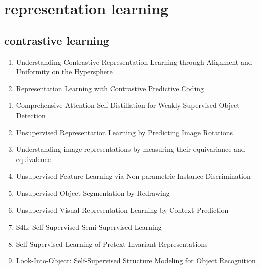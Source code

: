 \documentclass[acmlarge]{acmart}
\begin{document}
\section{representation learning}
	\subsection{contrastive learning}
	\begin{enumerate}
		\item Understanding Contrastive Representation Learning through Alignment and Uniformity on the Hypersphere \cite{Wang2020UnderstandingCR} 

		\item Representation Learning with Contrastive Predictive Coding \cite{Oord2018RepresentationLW} 

	\end{enumerate}
\begin{enumerate}
	\item Comprehensive Attention Self-Distillation for Weakly-Supervised Object Detection \cite{Huang2020ComprehensiveAS} 

	\item Unsupervised Representation Learning by Predicting Image Rotations \cite{Gidaris2018UnsupervisedRL} 

	\item Understanding image representations by measuring their equivariance and equivalence \cite{Lenc2015UnderstandingIR} 

	\item Unsupervised Feature Learning via Non-parametric Instance Discrimination \cite{Wu2018UnsupervisedFL} 

	\item Unsupervised Object Segmentation by Redrawing \cite{Chen2019UnsupervisedOS} 

	\item Unsupervised Visual Representation Learning by Context Prediction \cite{Doersch2015UnsupervisedVR} 

	\item S4L: Self-Supervised Semi-Supervised Learning \cite{Zhai2019S4LSS} 

	\item Self-Supervised Learning of Pretext-Invariant Representations \cite{Misra2020SelfSupervisedLO} 

	\item Look-Into-Object: Self-Supervised Structure Modeling for Object Recognition \cite{Zhou2020LookIntoObjectSS} 

\end{enumerate}
\end{document}
